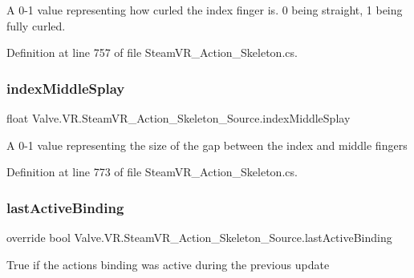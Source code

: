 A 0-\/1 value representing how curled the index finger is. 0 being straight, 1 being fully curled. 



Definition at line 757 of file Steam\+V\+R\+\_\+\+Action\+\_\+\+Skeleton.\+cs.

\mbox{\label{class_valve_1_1_v_r_1_1_steam_v_r___action___skeleton___source_a7de16520442772d896be0a867046f859}} 
\subsubsection{\texorpdfstring{indexMiddleSplay}{indexMiddleSplay}}
{\footnotesize\ttfamily float Valve.\+V\+R.\+Steam\+V\+R\+\_\+\+Action\+\_\+\+Skeleton\+\_\+\+Source.\+index\+Middle\+Splay\hspace{0.3cm}{\ttfamily [get]}}



A 0-\/1 value representing the size of the gap between the index and middle fingers 



Definition at line 773 of file Steam\+V\+R\+\_\+\+Action\+\_\+\+Skeleton.\+cs.

\mbox{\label{class_valve_1_1_v_r_1_1_steam_v_r___action___skeleton___source_aaf02827980541f09b42d64a301c9f828}} 
\subsubsection{\texorpdfstring{lastActiveBinding}{lastActiveBinding}}
{\footnotesize\ttfamily override bool Valve.\+V\+R.\+Steam\+V\+R\+\_\+\+Action\+\_\+\+Skeleton\+\_\+\+Source.\+last\+Active\+Binding\hspace{0.3cm}{\ttfamily [get]}}



True if the action\textquotesingle{}s binding was active during the previous update 



